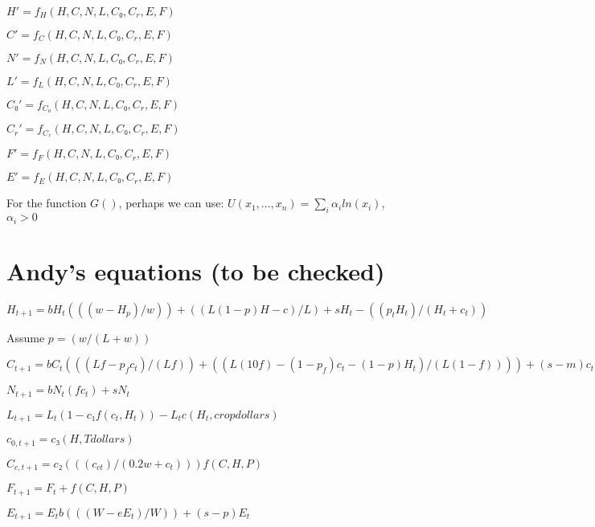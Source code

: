 \documentclass[12pt,reqno]{amsart}
\theoremstyle{mytheorem}
\theoremstyle{myremark}
\begin{document}
    
    $H′=f_{H}(H,C,N,L,C₀,C_{r},E,F)$
    
    $C′=f_{C}(H,C,N,L,C₀,C_{r},E,F)$
    
    $N′=f_{N}(H,C,N,L,C₀,C_{r},E,F)$
    
    $L′=f_{L}(H,C,N,L,C₀,C_{r},E,F)$
    
    $C₀′=f_{C₀}(H,C,N,L,C₀,C_{r},E,F)$
    
    $C_{r}′=f_{C_{r}}(H,C,N,L,C₀,C_{r},E,F)$
    
    $F′=f_{F}(H,C,N,L,C₀,C_{r},E,F)$
    
    $E′=f_{E}(H,C,N,L,C₀,C_{r},E,F)$
 \bigskip
 
For the function $G()$, perhaps we can use: $U(x_{1},...,x_{n})=\sum_{i}\alpha_{i}ln(x_{i})$, $\alpha_{i}>0$



\section{Andy's equations (to be checked)}

         $H_{t+1}=bH_{t}(((w-H_{p})/w))+((L(1-p)H-c)/L)+sH_{t}-((p_{t}H_{t})/(H_{t}+c_{t}))$
    
    Assume $p=(w/(L+w))$
    
    $C_{t+1}=bC_{t}(((Lf-p_{f}c_{t})/(Lf))+((L(10f)-(1-p_{f})c_{t}-(1-p)H_{t})/(L(1-f))))+(s-m)c_{t}-((αp_{t}c_{t}(1-f)L)/((c_{t}+(1-p_{f})+H_{t}(1-p)))$
    
    $N_{t+1}=bN_{t}(fc_{t})+sN_{t}$
    
    $L_{t+1}=L_{t}(1-c₁f(c_{t},H_{t}))-L_{t}c(H_{t},cropdollars)$
    
    $c_{0,t+1}=c₃(H,Tdollars)$
    
    $C_{c,t+1}=c₂(((c_{ct})/(0.2w+c_{t})))f(C,H,P)$

    $F_{t+1}=F_{t}+f(C,H,P)$
    
$E_{t+1}=E_{t}b(((W-eE_{t})/W))+(s-p)E_{t}$

\printbibliography
\end{document}
